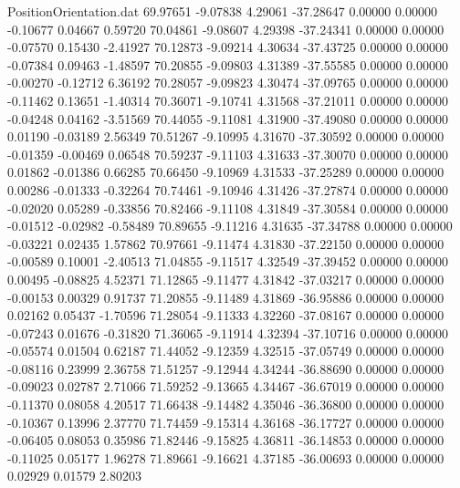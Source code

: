 \begin{filecontents}{PositionOrientation.dat}
  69.97651   -9.07838    4.29061   -37.28647    0.00000    0.00000   -0.10677    0.04667    0.59720
  70.04861   -9.08607    4.29398   -37.24341    0.00000    0.00000   -0.07570    0.15430   -2.41927
  70.12873   -9.09214    4.30634   -37.43725    0.00000    0.00000   -0.07384    0.09463   -1.48597
  70.20855   -9.09803    4.31389   -37.55585    0.00000    0.00000   -0.00270   -0.12712    6.36192
  70.28057   -9.09823    4.30474   -37.09765    0.00000    0.00000   -0.11462    0.13651   -1.40314
  70.36071   -9.10741    4.31568   -37.21011    0.00000    0.00000   -0.04248    0.04162   -3.51569
  70.44055   -9.11081    4.31900   -37.49080    0.00000    0.00000    0.01190   -0.03189    2.56349
  70.51267   -9.10995    4.31670   -37.30592    0.00000    0.00000   -0.01359   -0.00469    0.06548
  70.59237   -9.11103    4.31633   -37.30070    0.00000    0.00000    0.01862   -0.01386    0.66285
  70.66450   -9.10969    4.31533   -37.25289    0.00000    0.00000    0.00286   -0.01333   -0.32264
  70.74461   -9.10946    4.31426   -37.27874    0.00000    0.00000   -0.02020    0.05289   -0.33856
  70.82466   -9.11108    4.31849   -37.30584    0.00000    0.00000   -0.01512   -0.02982   -0.58489
  70.89655   -9.11216    4.31635   -37.34788    0.00000    0.00000   -0.03221    0.02435    1.57862
  70.97661   -9.11474    4.31830   -37.22150    0.00000    0.00000   -0.00589    0.10001   -2.40513
  71.04855   -9.11517    4.32549   -37.39452    0.00000    0.00000    0.00495   -0.08825    4.52371
  71.12865   -9.11477    4.31842   -37.03217    0.00000    0.00000   -0.00153    0.00329    0.91737
  71.20855   -9.11489    4.31869   -36.95886    0.00000    0.00000    0.02162    0.05437   -1.70596
  71.28054   -9.11333    4.32260   -37.08167    0.00000    0.00000   -0.07243    0.01676   -0.31820
  71.36065   -9.11914    4.32394   -37.10716    0.00000    0.00000   -0.05574    0.01504    0.62187
  71.44052   -9.12359    4.32515   -37.05749    0.00000    0.00000   -0.08116    0.23999    2.36758
  71.51257   -9.12944    4.34244   -36.88690    0.00000    0.00000   -0.09023    0.02787    2.71066
  71.59252   -9.13665    4.34467   -36.67019    0.00000    0.00000   -0.11370    0.08058    4.20517
  71.66438   -9.14482    4.35046   -36.36800    0.00000    0.00000   -0.10367    0.13996    2.37770
  71.74459   -9.15314    4.36168   -36.17727    0.00000    0.00000   -0.06405    0.08053    0.35986
  71.82446   -9.15825    4.36811   -36.14853    0.00000    0.00000   -0.11025    0.05177    1.96278
  71.89661   -9.16621    4.37185   -36.00693    0.00000    0.00000    0.02929    0.01579    2.80203

\end{filecontents}
